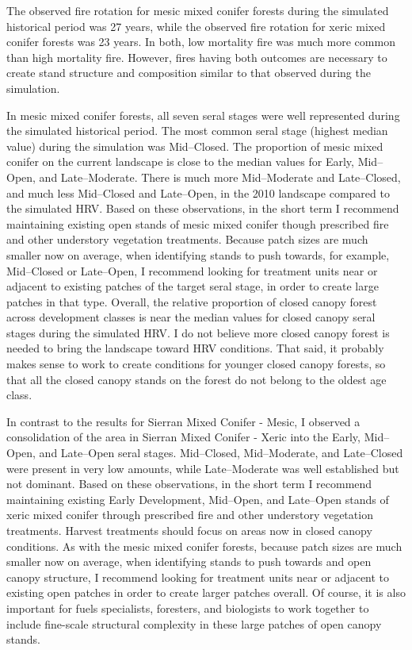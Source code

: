 The observed fire rotation for mesic mixed conifer forests during the simulated historical period was 27 years, while the observed fire rotation for xeric mixed conifer forests was 23 years. In both, low mortality fire was much more common than high mortality fire. However, fires having both outcomes are necessary to create stand structure and composition similar to that observed during the simulation. 

In mesic mixed conifer forests, all seven seral stages were well represented during the simulated historical period. The most common seral stage (highest median value) during the simulation was Mid--Closed. The proportion of mesic mixed conifer on the current landscape is close to the median values for Early, Mid--Open, and Late--Moderate. There is much more Mid--Moderate and Late--Closed, and much less Mid--Closed and Late--Open, in the 2010 landscape compared to the simulated HRV. Based on these observations, in the short term I recommend maintaining existing open stands of mesic mixed conifer though prescribed fire and other understory vegetation treatments. Because patch sizes are much smaller now on average, when identifying stands to push towards, for example, Mid--Closed or Late--Open, I recommend looking for treatment units near or adjacent to existing patches of the target seral stage, in order to create large patches in that type. Overall, the relative proportion of closed canopy forest across development classes is near the median values for closed canopy seral stages during the simulated HRV. I do not believe more closed canopy forest is needed to bring the landscape toward HRV conditions. That said, it probably makes sense to work to create conditions for younger closed canopy forests, so that all the closed canopy stands on the forest do not belong to the oldest age class.

In contrast to the results for Sierran Mixed Conifer - Mesic, I observed a consolidation of the area in Sierran Mixed Conifer - Xeric into the Early, Mid--Open, and Late--Open seral stages. Mid--Closed, Mid--Moderate, and Late--Closed were present in very low amounts, while Late--Moderate was well established but not dominant. Based on these observations, in the short term I recommend maintaining existing Early Development, Mid--Open, and Late--Open stands of xeric mixed conifer through prescribed fire and other understory vegetation treatments. Harvest treatments should focus on areas now in closed canopy conditions. As with the mesic mixed conifer forests, because patch sizes are much smaller now on average, when identifying stands to push towards and open canopy structure, I recommend looking for treatment units near or adjacent to existing open patches in order to create larger patches overall. Of course, it is also important for fuels specialists, foresters, and biologists to work together to include fine-scale structural complexity in these large patches of open canopy stands.
 
